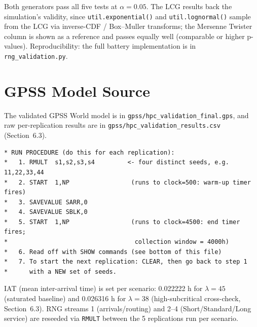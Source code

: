 \documentclass[11pt,a4paper]{article}
\newcommand{\lam}{\ensuremath{\lambda}}
\begin{document}
Both generators pass all five tests at $\alpha=0.05$. The LCG results back the simulation's validity,
since \texttt{util.exponential()} and \texttt{util.lognormal()} sample from the LCG via inverse-CDF /
Box--Muller transforms; the Mersenne Twister column is shown as a reference and passes equally well
(comparable or higher p-values). Reproducibility: the full battery implementation is in
\texttt{rng\_validation.py}.

\section{GPSS Model Source}

The validated GPSS World model is in \texttt{gpss/hpc\_validation\_final.gps}, and raw per-replication
results are in \texttt{gpss/hpc\_validation\_results.csv} (Section~6.3).

\begin{lstlisting}[language={}]
* RUN PROCEDURE (do this for each replication):
*   1. RMULT  s1,s2,s3,s4         <- four distinct seeds, e.g. 11,22,33,44
*   2. START  1,NP                 (runs to clock=500: warm-up timer fires)
*   3. SAVEVALUE SARR,0
*   4. SAVEVALUE SBLK,0
*   5. START  1,NP                 (runs to clock=4500: end timer fires;
*                                   collection window = 4000h)
*   6. Read off with SHOW commands (see bottom of this file)
*   7. To start the next replication: CLEAR, then go back to step 1
*      with a NEW set of seeds.
\end{lstlisting}

IAT (mean inter-arrival time) is set per scenario: 0.022222 h for $\lam=45$ (saturated baseline) and
0.026316 h for $\lam=38$ (high-subcritical cross-check, Section~6.3). RNG streams 1
(arrivals/routing) and 2--4 (Short/Standard/Long service) are reseeded via \texttt{RMULT} between the
5 replications run per scenario.
\end{document}
